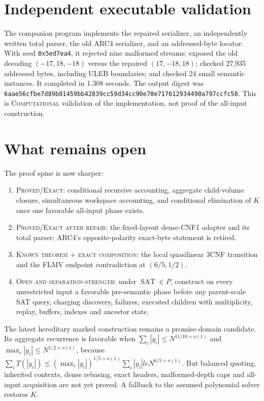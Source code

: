 \documentclass[11pt]{article}
\newcommand{\SAT}{\operatorname{SAT}}
\begin{document}
\section{Independent executable validation}

The companion program implements the repaired serializer, an independently
written total parser, the old ARC4 serializer, and an addressed-byte locator.
With seed \texttt{0x5ed7ea4}, it rejected nine malformed streams; exposed the
old decoding $(-17,18,-18)$ versus the repaired $(17,-18,18)$; checked 27,935
addressed bytes, including ULEB boundaries; and checked 24 small semantic
instances.  It completed in 1.308 seconds.  The output digest was
\texttt{6aae56cfbe7d89b01459bb42839cc59d34cc90e70e717612934490a797ccfc58}.
This is \textsc{Computational} validation of the implementation, not proof of
the all-input construction.

\section{What remains open}

The proof spine is now sharper:
\begin{enumerate}
\item \textsc{Proved/Exact}: conditional recursive accounting, aggregate
child-volume closure, simultaneous workspace accounting, and conditional
elimination of $K$ once one favorable all-input phase exists.
\item \textsc{Proved/Exact after repair}: the fixed-layout dense-CNF1 adapter
and its total parser; ARC4's opposite-polarity exact-byte statement is retired.
\item \textsc{Known theorem + exact composition}: the local quasilinear 3CNF
transition and the FLMV endpoint contradiction at $(6/5,1/2)$.
\item \textsc{Open and separation-strength}: under $\SAT\in P$, construct on
every unrestricted input a favorable pre-semantic phase before any
parent-scale SAT query, charging discovery, failures, executed children with
multiplicity, replay, buffers, indexes and ancestor state.
\end{enumerate}

The latest hereditary marked construction remains a promise-domain candidate.
Its aggregate recurrence is favorable when
$\sum_i|y_i|\le N^{11/10+o(1)}$ and
$\max_i|y_i|\le N^{1/2+o(1)}$, because
$\sum_iT(|y_i|)\le (\max_i|y_i|)^{1/5+o(1)}\sum_i|y_i|le
N^{6/5+o(1)}$.  But balanced quoting, inherited contexts, dense rebasing,
exact headers, malformed-depth caps and all-input acquisition are not yet
proved.  A fallback to the assumed polynomial solver restores $K$.
\end{document}

